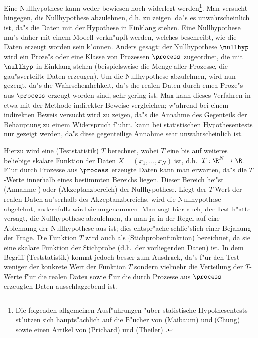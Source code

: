 Eine Nullhypothese kann weder bewiesen noch widerlegt werden\footnote{Die folgenden
  allgemeinen Ausf"uhrungen "uber statistische Hypothesentests st"utzen sich
  haupts"achlich auf die B"ucher von \autor(Maibaum) \cite{Maibaum76} und \autor(Chung)
  \cite{Chung79} sowie einen Artikel von \autor(Prichard) und \autor(Theiler)
  \cite{Prichard-theiler3}.}. Man versucht hingegen, die Nullhypothese abzulehnen, d.h. zu
zeigen, da"s es unwahrscheinlich ist, da"s die Daten mit der Hypothese in Einklang stehen.
Eine Nullhypothese mu"s daher mit einem Modell verkn"upft werden, welches beschreibt, wie
die Daten erzeugt worden sein k"onnen.  Anders gesagt: der Nullhypothese $\nullhyp$ wird
ein Proze"s oder eine Klasse von Prozessen $\process$ zugeordnet, die mit $\nullhyp$ in
Einklang stehen (beispielsweise die Menge aller Prozesse, die gau"sverteilte Daten
erzeugen). Um die Nullhypothese abzulehnen, wird nun gezeigt, da"s die
Wahrscheinlichkeit, da"s die realen Daten durch einen Proze"s aus $\process$ erzeugt
worden sind, sehr gering ist. Man kann dieses Verfahren in etwa mit der Methode indirekter
Beweise vergleichen; w"ahrend bei einem indirekten Beweis versucht wird zu zeigen, da"s
die Annahme des Gegenteils der Behauptung zu einem Widerspruch f"uhrt, kann bei
statistischen Hypothesentests nur gezeigt werden, da"s diese gegenteilige Annahme sehr
unwahrscheinlich ist.


Hierzu wird eine \begriff(Teststatistik) $T$ berechnet, wobei $T$ eine bis auf weiteres
beliebige skalare Funktion der Daten $X=(x_1,\dots,x_N)$ ist, d.h.\ $T:\R^N\to\R$.  F"ur
durch Prozesse aus $\process$ erzeugte Daten kann man erwarten, da"s die $T$-Werte
innerhalb eines bestimmten Bereichs liegen. Dieser Bereich hei"st \begriff(Annahme-) oder
\begriff(Akzeptanzbereich) der Nullhypothese.  Liegt der $T$-Wert der realen Daten
au"serhalb des Akzeptanzbereichs, wird die Nullhypothese abgelehnt, andernfalls wird sie
angenommen.  Man sagt hier auch, der Test h"atte versagt, die Nullhypothese abzulehnen, da
man ja in der Regel auf eine Ablehnung der Nullhypothese aus ist; dies entspr"ache
schlie"slich einer Bejahung der Frage.  Die Funktion $T$ wird auch als
\begriff(Stichprobenfunktion) bezeichnet, da sie eine skalare Funktion der Stichprobe
(d.h.\ der vorliegenden Daten) ist. In dem Begriff \naja(Teststatistik) kommt jedoch
besser zum Ausdruck, da"s f"ur den Test weniger der konkrete Wert der Funktion $T$ sondern
vielmehr die Verteilung der $T$-Werte f"ur die realen Daten sowie f"ur die durch Prozesse
aus $\process$ erzeugten Daten ausschlaggebend ist.

